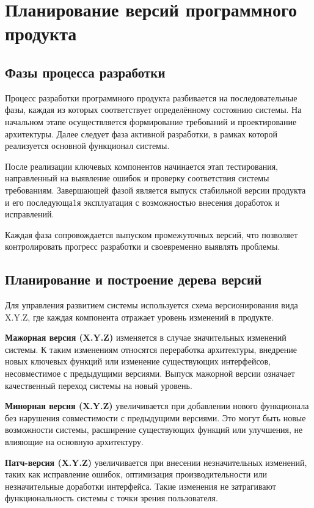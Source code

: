 \documentclass[14pt,a4paper]{extarticle}
\begin{document}
\section{Планирование версий программного продукта}

\subsection{Фазы процесса разработки}

Процесс разработки программного продукта разбивается на последовательные фазы, каждая из которых соответствует определённому состоянию системы. На начальном этапе осуществляется формирование требований и проектирование архитектуры. Далее следует фаза активной разработки, в рамках которой реализуется основной функционал системы.

После реализации ключевых компонентов начинается этап тестирования, направленный на выявление ошибок и проверку соответствия системы требованиям. Завершающей фазой является выпуск стабильной версии продукта и его последующа1я эксплуатация с возможностью внесения доработок и исправлений.

Каждая фаза сопровождается выпуском промежуточных версий, что позволяет контролировать прогресс разработки и своевременно выявлять проблемы.

\subsection{Планирование и построение дерева версий}

Для управления развитием системы используется схема версионирования вида X.Y.Z, где каждая компонента отражает уровень изменений в продукте.

\textbf{Мажорная версия (X.Y.Z)} изменяется в случае значительных изменений
системы. К таким изменениям относятся переработка архитектуры, внедрение новых
ключевых функций или изменение существующих интерфейсов, несовместимое с
предыдущими версиями. Выпуск мажорной версии означает качественный переход
системы на новый уровень.

\textbf{Минорная версия (X.Y.Z)} увеличивается при добавлении нового
функционала без нарушения совместимости с предыдущими версиями. Это могут быть
новые возможности системы, расширение существующих функций или улучшения, не
влияющие на основную архитектуру.

\textbf{Патч-версия (X.Y.Z)} увеличивается при внесении незначительных
изменений, таких как исправление ошибок, оптимизация производительности или
незначительные доработки интерфейса. Такие изменения не затрагивают
функциональность системы с точки зрения пользователя.
\end{document}
